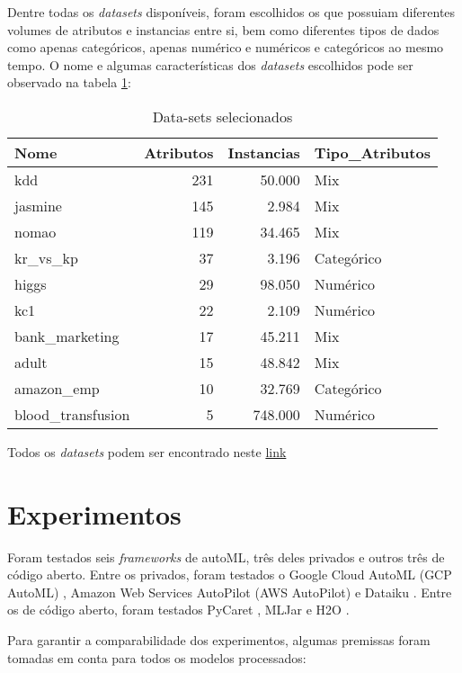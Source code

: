 \documentclass[9pt, a4paper, twocolumn]{article}
\begin{document}
Dentre todas os \emph{datasets} disponíveis, foram escolhidos os que possuiam diferentes volumes de atributos e instancias entre si, bem como diferentes tipos de dados como apenas categóricos, apenas numérico e numéricos e categóricos ao mesmo tempo. O nome e algumas características dos \emph{datasets} escolhidos pode ser observado na tabela \ref{tab:tabledatasets}:

\begin{table}[!h]

\caption{\label{tab:tabledatasets}Data-sets selecionados}
\centering
\fontsize{8.5}{10.5}\selectfont
\begin{tabular}[t]{lrrl}
\toprule
Nome & Atributos & Instancias & Tipo\_Atributos\\
\midrule
kdd & 231 & 50.000 & Mix\\
jasmine & 145 & 2.984 & Mix\\
nomao & 119 & 34.465 & Mix\\
kr\_vs\_kp & 37 & 3.196 & Categórico\\
higgs & 29 & 98.050 & Numérico\\
\addlinespace
kc1 & 22 & 2.109 & Numérico\\
bank\_marketing & 17 & 45.211 & Mix\\
adult & 15 & 48.842 & Mix\\
amazon\_emp & 10 & 32.769 & Categórico\\
blood\_transfusion & 5 & 748.000 & Numérico\\
\bottomrule
\end{tabular}
\end{table}

Todos os \textit{datasets} podem ser encontrado neste \href{https://www.openml.org/search?type=data\&sort=runs\&status=active}{link}

\hypertarget{experimentos}{%
\section{Experimentos}\label{experimentos}}

Foram testados seis \emph{frameworks} de autoML, três deles privados e outros três de código aberto. Entre os privados, foram testados o Google Cloud AutoML (GCP AutoML) \cite{GCPAutoML}, Amazon Web Services AutoPilot (AWS AutoPilot) \cite{AWSAutopilot} e Dataiku \cite{Dataiku}. Entre os de código aberto, foram testados PyCaret \cite{PyCaret}, MLJar \cite{mljar} e H2O \cite{H2OAutoML20}.

Para garantir a comparabilidade dos experimentos, algumas premissas foram tomadas em conta para todos os modelos processados:
\end{document}
